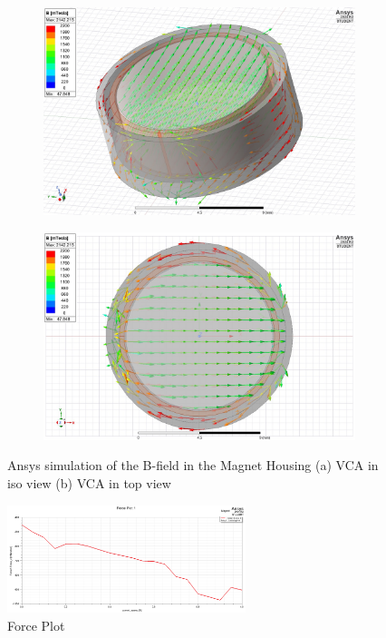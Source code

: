 \begin{figure}[ht]
    \centering
    \begin{subfigure}[b]{0.45\textwidth}
    \includegraphics[width=\textwidth]{img/B_Vektor_Iso.jpg}
    \caption{}
    \label{subfig:B_Vektor_Iso}
    \end{subfigure}
    \hfill
    \begin{subfigure}[b]{0.45\textwidth}
    \includegraphics[width=\textwidth]{img/B_Vektor_Top.jpg}
    \caption{}
    \label{subfig:B_Vektor_Top}
    \end{subfigure}
    \vspace{0.1cm}
    \caption{Ansys simulation of the B-field in the Magnet Housing (a) VCA in iso view (b) VCA in top view}
    \label{fig:B_Vektor}
\end{figure}


\begin{figure}[H]
    \centering
    \includegraphics[width=0.62\textwidth]{img/Force Plot 1.png}
    \caption[Force Plot]{Force Plot}
    \label{fig:ForcePlot}
\end{figure}



